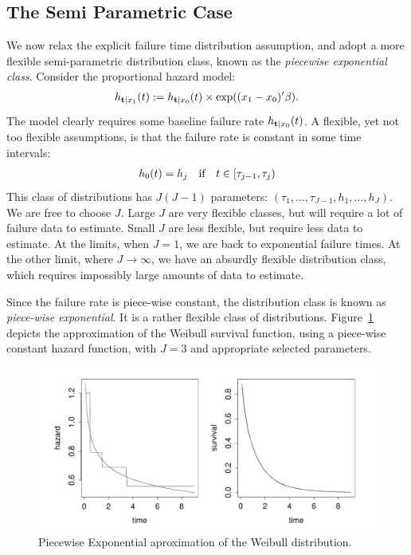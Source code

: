 \documentclass[12pt,a4paper]{report}
\theoremstyle{plain}
\theoremstyle{definition}
\begin{document}
\subsection{The Semi Parametric Case}
We now relax the explicit failure time distribution assumption, and adopt a more flexible semi-parametric distribution class, known as the \emph{piecewise exponential class}.
Consider the proportional hazard model:
\begin{align}
	h_{\mathbf{t}|x_1} (t):=h_{\mathbf{t}|x_0} (t) \times \exp((x_1-x_0)'\beta).
\end{align}
The model clearly requires some baseline failure rate $h_{\mathbf{t}|x_0} (t)$.
A flexible, yet not too flexible assumptions, is that the failure rate is constant in some time intervals:
\begin{align}
	h_{0} (t)=h_j \quad \text{if} \quad t\in [\tau_{j-1},\tau_j)
\end{align}
This class of distributions has $J(J-1)$ parameters: $(\tau_1,\dots,\tau_{J-1},h_1,\dots,h_J)$.
We are free to choose $J$. 
Large $J$ are very flexible classes, but will require a lot of failure data to estimate.
Small $J$ are less flexible, but require less data to estimate. 
At the limits, when $J=1$, we are back to exponential failure times. 
At the other limit, where $J \to \infty$, we have an absurdly flexible distribution class, which requires impossibly large amounts of data to estimate.

Since the failure rate is piece-wise constant, the distribution class is known as \emph{piece-wise exponential}.
It is a rather flexible class of distributions. Figure~\ref{fig:piecewise_exponential} depicts the approximation of the Weibull survival function, using a piece-wise constant hazard function, with $J=3$ and appropriate selected parameters.
\begin{figure}[ht]
\centering
\includegraphics[height=0.2\textheight]{art/piecewise_exponential}
\caption{Piecewise Exponential aproximation of the Weibull distribution.}
\label{fig:piecewise_exponential}
\end{figure}
\end{document}
